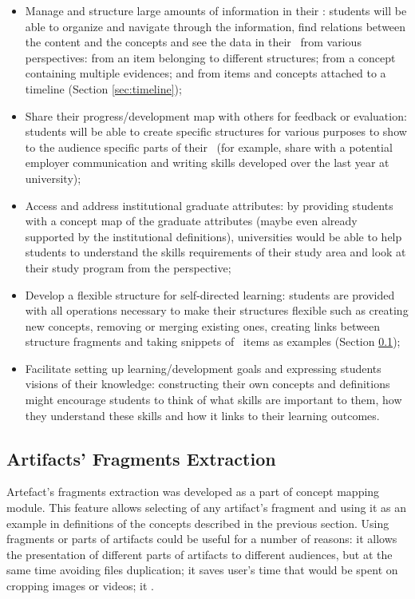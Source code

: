 \begin{itemize}
  \item Manage and structure large amounts of information in their \ep:
  students will be able to organize and navigate through the information, find
  relations between the content and the concepts and see the data in their
  \ep~from various perspectives: from an item belonging to different
  structures; from a concept containing multiple evidences; and from items and
  concepts attached to a timeline (Section \ref{sec:timeline});

\item Share their progress/development map with others for feedback or
evaluation: students will be able to create specific structures for various
purposes to show to the audience specific parts of their \ep~(for example,
share with a potential employer communication and writing skills developed over
the last year at university);

\item Access and address institutional graduate attributes: by providing
students with a concept map of the graduate attributes (maybe even already
supported by the institutional definitions), universities would be able to
help students to understand the skills requirements of their study area and look
at their study program from the \LLLs perspective;

\item Develop a flexible structure for self-directed learning: students are
provided with all operations necessary to make their structures flexible such as
creating new concepts, removing or merging existing ones, creating links between
structure fragments and taking snippets of \ep~items as examples (Section
\ref{sec:frag});

\item Facilitate setting up learning/development goals and expressing students
visions of their knowledge: constructing their own concepts and definitions
might encourage students to think of what skills are important to them, how they
understand these skills and how it links to their learning outcomes.
\end{itemize}

\subsection{Artifacts' Fragments Extraction}
\label{sec:frag}

Artefact's fragments extraction was developed as a part of concept mapping
module. This feature allows selecting of any artifact's fragment and using
it as an example in definitions of the concepts described in the previous
section. Using fragments or parts of artifacts could be useful for a number of
reasons: it allows the presentation of different parts of artifacts to different
audiences, but at the same time avoiding files duplication; it saves user's time
that would be spent on cropping images or videos; it .

